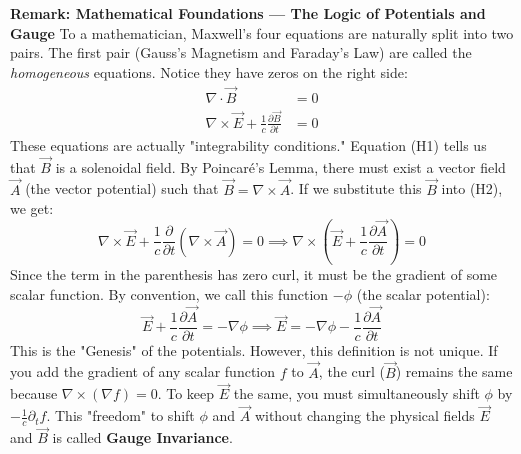 \begin{solution}
\textbf{Remark: Mathematical Foundations --- The Logic of Potentials and Gauge}
To a mathematician, Maxwell's four equations are naturally split into two pairs. The first pair (Gauss's Magnetism and Faraday's Law) are called the \textit{homogeneous} equations. Notice they have zeros on the right side:
\begin{align}
    \nabla \cdot \vec{B} &= 0 \tag{H1} \\
    \nabla \times \vec{E} + \frac{1}{c} \frac{\partial \vec{B}}{\partial t} &= 0 \tag{H2}
\end{align}
These equations are actually "integrability conditions." 
Equation (H1) tells us that $\vec{B}$ is a solenoidal field. By Poincaré's Lemma, there must exist a vector field $\vec{A}$ (the vector potential) such that $\vec{B} = \nabla \times \vec{A}$. 
If we substitute this $\vec{B}$ into (H2), we get:
\begin{equation*}
    \nabla \times \vec{E} + \frac{1}{c} \frac{\partial}{\partial t} (\nabla \times \vec{A}) = 0 \implies \nabla \times \left( \vec{E} + \frac{1}{c} \frac{\partial \vec{A}}{\partial t} \right) = 0
\end{equation*}
Since the term in the parenthesis has zero curl, it must be the gradient of some scalar function. By convention, we call this function $-\phi$ (the scalar potential):
\begin{equation*}
    \vec{E} + \frac{1}{c} \frac{\partial \vec{A}}{\partial t} = -\nabla \phi \implies \vec{E} = -\nabla \phi - \frac{1}{c} \frac{\partial \vec{A}}{\partial t}
\end{equation*}
This is the "Genesis" of the potentials. However, this definition is not unique. If you add the gradient of any scalar function $f$ to $\vec{A}$, the curl ($\vec{B}$) remains the same because $\nabla \times (\nabla f) = 0$. To keep $\vec{E}$ the same, you must simultaneously shift $\phi$ by $-\frac{1}{c} \partial_t f$. This "freedom" to shift $\phi$ and $\vec{A}$ without changing the physical fields $\vec{E}$ and $\vec{B}$ is called \textbf{Gauge Invariance}.


\end{solution}
